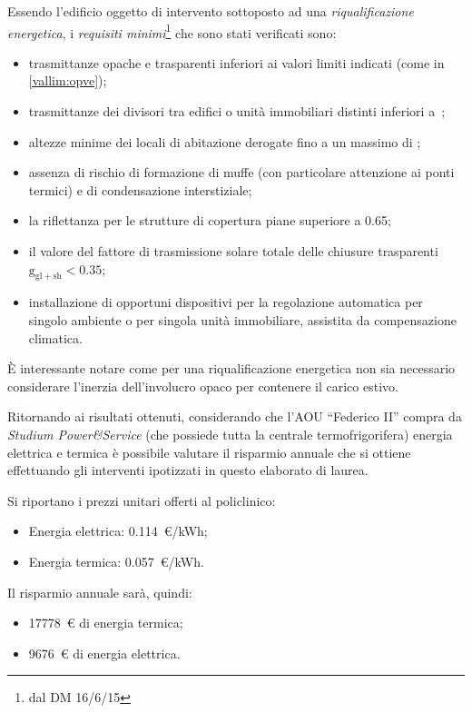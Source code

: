 Essendo l'edificio oggetto di intervento sottoposto ad una \emph{riqualificazione energetica}, i \emph{requisiti minimi}\footnote{dal DM 16/6/15} che sono stati verificati sono:
\begin{itemize}
	\item trasmittanze opache e trasparenti inferiori ai valori limiti indicati (come in \vref{vallim:opve});
	\item trasmittanze dei divisori tra edifici o unità immobiliari distinti inferiori a~;
	\item altezze minime dei locali di abitazione derogate fino a un massimo di ;
	\item assenza di rischio di formazione di muffe (con particolare attenzione ai ponti termici) e di condensazione interstiziale;
	\item la riflettanza per le strutture di copertura piane superiore a \num{0.65};
	\item il valore del fattore di trasmissione solare totale delle chiusure trasparenti $\mathrm{g_{gl+sh}<0.35}$;
	\item installazione di opportuni dispositivi per la regolazione automatica per singolo ambiente o per singola unità immobiliare, assistita da compensazione climatica.
\end{itemize}
È interessante notare come per una riqualificazione energetica non sia necessario considerare l'inerzia dell'involucro opaco per contenere il carico estivo.

Ritornando ai risultati ottenuti, considerando che l'AOU ``Federico II'' compra da \emph{Studium Power\&Service} (che possiede tutta la centrale termofrigorifera) energia elettrica e termica è possibile valutare il risparmio annuale che si ottiene effettuando gli interventi ipotizzati in questo elaborato di laurea.

Si riportano i prezzi unitari offerti al policlinico: 
\begin{itemize}
	\item Energia elettrica: \num{0.114}\ \euro/kWh;
	\item Energia termica: \num{0.057}\ \euro/kWh.
\end{itemize}
Il risparmio annuale sarà, quindi:
\begin{itemize}
	\item \num{17778}\ \euro\- di energia termica; %
	\item \num{9676}\ \euro\- di energia elettrica.
\end{itemize}

